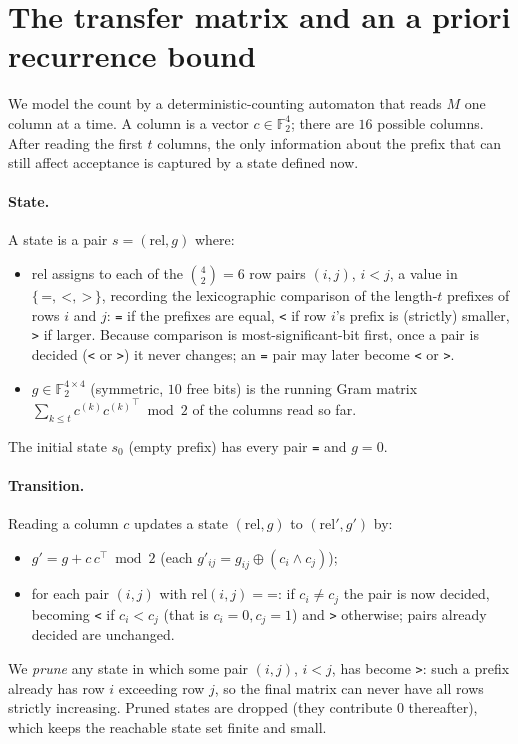 \documentclass[11pt]{article}
\theoremstyle{definition}
\newcommand{\F}{\mathbb{F}_2}
\begin{document}
\section{The transfer matrix and an a priori recurrence bound}\label{sec:tm}

We model the count by a deterministic-counting automaton that reads $M$ one column at a
time. A column is a vector $c\in\F^4$; there are $16$ possible columns. After reading the
first $t$ columns, the only information about the prefix that can still affect acceptance
is captured by a state defined now.

\paragraph{State.}
A state is a pair $s=(\mathrm{rel},g)$ where:
\begin{itemize}
\item $\mathrm{rel}$ assigns to each of the $\binom{4}{2}=6$ row pairs $(i,j)$, $i<j$, a
  value in $\{\,\texttt{=},\ \texttt{<},\ \texttt{>}\,\}$, recording the lexicographic
  comparison of the length-$t$ prefixes of rows $i$ and $j$: \texttt{=} if the prefixes are
  equal, \texttt{<} if row $i$'s prefix is (strictly) smaller, \texttt{>} if larger. Because
  comparison is most-significant-bit first, once a pair is decided (\texttt{<} or
  \texttt{>}) it never changes; an \texttt{=} pair may later become \texttt{<} or \texttt{>}.
\item $g\in\F^{4\times4}$ (symmetric, $10$ free bits) is the running Gram matrix
  $\sum_{k\le t} c^{(k)}{c^{(k)}}^{\!\top}\bmod 2$ of the columns read so far.
\end{itemize}
The initial state $s_0$ (empty prefix) has every pair \texttt{=} and $g=0$.

\paragraph{Transition.}
Reading a column $c$ updates a state $(\mathrm{rel},g)$ to $(\mathrm{rel}',g')$ by:
\begin{itemize}
\item $g' = g + c\,c^{\!\top}\bmod 2$ (each $g'_{ij}=g_{ij}\oplus(c_i\wedge c_j)$);
\item for each pair $(i,j)$ with $\mathrm{rel}(i,j)=\texttt{=}$: if $c_i\ne c_j$ the pair is
  now decided, becoming \texttt{<} if $c_i<c_j$ (that is $c_i=0,c_j=1$) and \texttt{>}
  otherwise; pairs already decided are unchanged.
\end{itemize}
We \emph{prune} any state in which some pair $(i,j)$, $i<j$, has become \texttt{>}: such a
prefix already has row $i$ exceeding row $j$, so the final matrix can never have all rows
strictly increasing. Pruned states are dropped (they contribute $0$ thereafter), which
keeps the reachable state set finite and small.
\end{document}
